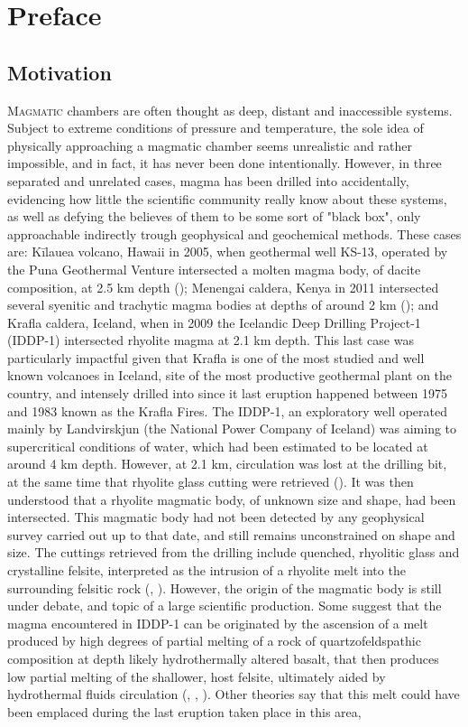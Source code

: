 \chapter*{Preface}
\section*{Motivation}
\lettrine{M}{agmatic} chambers are often thought as deep, distant and inaccessible systems. Subject to extreme conditions of pressure and temperature, the sole idea of physically approaching a magmatic chamber seems unrealistic and rather impossible, and in fact, it has never been done intentionally. However, in three separated and unrelated cases, magma has been drilled into accidentally, evidencing how little the scientific community really know about these systems, as well as defying the believes of them to be some sort of "black box", only approachable indirectly trough geophysical and geochemical methods. These cases are: Kīlauea volcano, Hawaii in 2005, when geothermal well KS-13, operated by the Puna Geothermal Venture intersected a molten magma body, of dacite composition, at 2.5 km depth (\cite{teplow2008}); Menengai caldera, Kenya in 2011 intersected several syenitic and trachytic magma bodies at depths of around 2 km (\cite{mbia2014}); and Krafla caldera, Iceland, when in 2009 the Icelandic Deep Drilling Project-1 (IDDP-1) intersected rhyolite magma at 2.1 km depth. This last case was particularly impactful given that Krafla is one of the most studied and well known volcanoes in Iceland, site of the most productive geothermal plant on the country, and intensely drilled into since it last eruption happened between 1975 and 1983 known as the Krafla Fires. The IDDP-1, an exploratory well operated mainly by Landvirskjun (the National Power Company of Iceland) was aiming to supercritical conditions of water, which had been estimated to be located at around 4 km depth. However, at 2.1 km, circulation was lost at the drilling bit, at the same time that rhyolite glass cutting were retrieved (\cite{elders2011}). It was then understood that a rhyolite magmatic body, of unknown size and shape, had been intersected. This magmatic body had not been detected by any geophysical survey carried out up to that date, and still remains unconstrained on shape and size. The cuttings retrieved from the drilling include quenched, rhyolitic glass and crystalline felsite, interpreted as the intrusion of a rhyolite melt into the surrounding felsitic rock (\cite{gautason2010}, \cite{schiffman2014}). However, the origin of the magmatic body is still under debate, and topic of a large scientific production. Some suggest that the magma encountered in IDDP-1 can be originated by the ascension of a melt produced by high degrees of partial melting of a rock of quartzofeldspathic composition at depth likely hydrothermally altered basalt, that then produces low partial melting of the shallower, host felsite, ultimately aided by hydrothermal fluids circulation (\cite{zierenberg2013}, \cite{masotta2018}, \cite{saubin2021}). Other theories say that this melt could have been emplaced during the last eruption taken place in this area, 